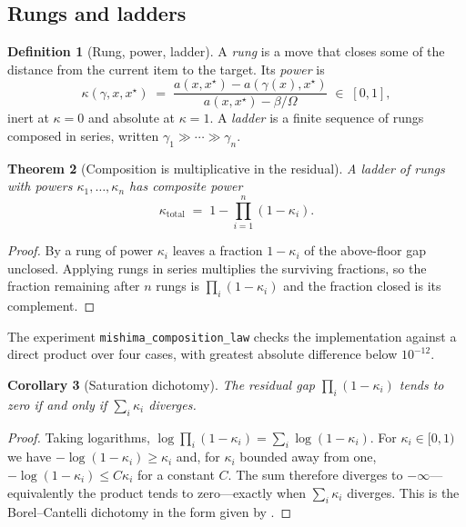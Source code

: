 \documentclass[11pt,twocolumn,a4paper]{article}
\newtheorem{theorem}{Theorem}[section]
\newtheorem{corollary}[theorem]{Corollary}
\theoremstyle{definition}
\newtheorem{definition}[theorem]{Definition}
\theoremstyle{remark}
\newcommand{\flo}{\beta}
\newcommand{\pot}{\kappa}
\newcommand{\Om}{\Omega}
\begin{document}
\subsection{Rungs and ladders}

\begin{definition}[Rung, power, ladder]
\label{def:rung}
A \emph{rung} is a move that closes some of the distance from the current item to
the target. Its \emph{power} is
\[
  \pot(\gamma,x,x^{\star})
  \;=\;
  \frac{a(x,x^{\star}) - a(\gamma(x),x^{\star})}
       {a(x,x^{\star}) - \flo/\Om}\;\in\;[0,1],
\]
inert at $\pot=0$ and absolute at $\pot=1$. A \emph{ladder} is a finite sequence
of rungs composed in series, written $\gamma_1 \gg \cdots \gg \gamma_n$.
\end{definition}

\begin{theorem}[Composition is multiplicative in the residual]
\label{thm:multiplicative}
A ladder of rungs with powers $\pot_1,\dots,\pot_n$ has composite power
\[
  \pot_{\mathrm{total}} \;=\; 1-\prod_{i=1}^{n}\left(1-\pot_i\right).
\]
\end{theorem}

\begin{proof}
By  a rung of power $\pot_i$ leaves a fraction $1-\pot_i$ of the
above-floor gap unclosed. Applying rungs in series multiplies the surviving
fractions, so the fraction remaining after $n$ rungs is $\prod_i(1-\pot_i)$ and
the fraction closed is its complement.
\end{proof}

The experiment \texttt{mishima\_composition\_law} checks the implementation
against a direct product over four cases, with greatest absolute difference below
$10^{-12}$.

\begin{corollary}[Saturation dichotomy]
\label{cor:saturation}
The residual gap $\prod_i(1-\pot_i)$ tends to zero if and only if
$\sum_i \pot_i$ diverges.
\end{corollary}

\begin{proof}
Taking logarithms, $\log\prod_i(1-\pot_i)=\sum_i\log(1-\pot_i)$. For
$\pot_i\in[0,1)$ we have $-\log(1-\pot_i)\ge \pot_i$ and, for $\pot_i$ bounded
away from one, $-\log(1-\pot_i)\le C\pot_i$ for a constant $C$. The sum therefore
diverges to $-\infty$---equivalently the product tends to zero---exactly when
$\sum_i\pot_i$ diverges. This is the Borel--Cantelli dichotomy in the form given
by \citet{borel1909probabilites}.
\end{proof}
\end{document}
